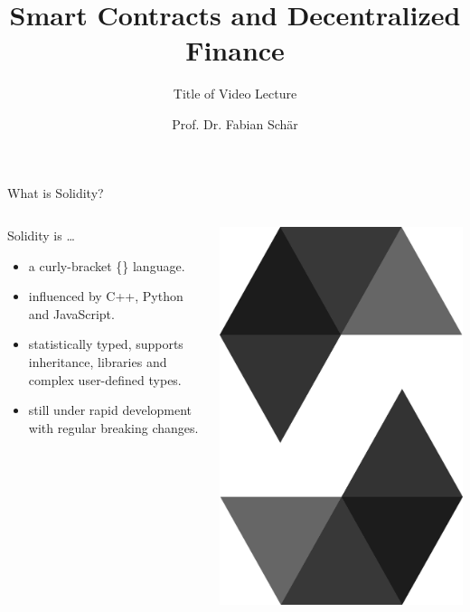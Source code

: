 \documentclass[handout]{beamer}
\title{Smart Contracts and Decentralized Finance}
\subtitle{Title of Video Lecture}
\author{Prof. Dr. Fabian Schär}
\institute{University of Basel}
\begin{document}
\thispagestyle{empty}
\begin{frame}[noframenumbering]
	\titlepage
\end{frame}

\begin{frame}{What is Solidity?}

\begin{columns}[T]
	\begin{column}{0.7\textwidth}
		Solidity is \dots
			\begin{itemize}
				\item<1-> a curly-bracket \{\} language.
				\item<2-> influenced by C++, Python and JavaScript.
				\item<3-> statistically typed, supports inheritance, libraries and complex user-defined types.
				\item<4-> still under rapid development with regular breaking changes.
			\end{itemize}
	\end{column}
	\begin{column}{0.3\textwidth}
	\center
			\includegraphics[scale=0.04]{../assets/images/solidity_logo_new}
	\end{column}
\end{columns}	


\end{frame}
\end{document}
